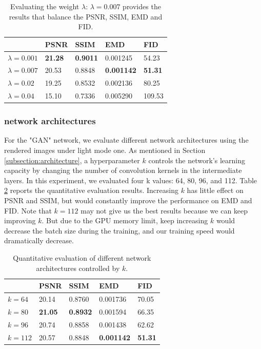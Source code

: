 \documentclass[journal]{vgtc}                %
\begin{document}
\begin{table}
\caption{Evaluating the weight $\lambda$: $\lambda=0.007$ provides the results that balance the PSNR, SSIM, EMD and FID. }
    \centering
    \begin{tabular}{l|l|l|l|l}
         & PSNR & SSIM & EMD & FID \\  \hline
         $\lambda=0.001$ & \textbf{21.28} & \textbf{0.9011} & 0.001245 & 54.23
   \\ \hline
         $\lambda=0.007$ & 20.53 & 0.8848 & \textbf{0.001142} & \textbf{51.31}  \\  \hline
         $\lambda=0.02$ & 19.25 & 0.8532 & 0.002136 & 80.25  \\  \hline
         $\lambda=0.04$ & 15.10 & 0.7336 & 0.005290 & 109.53  \\  
    \end{tabular}
    \label{table:lambda}
\end{table}

\subsubsection{network architectures}
For the "GAN" network, we evaluate different network architectures using the rendered images under light mode one. As mentioned in Section \ref{subsection:architecture}, a hyperparameter $k$ controls the network's learning capacity by changing the number of convolution kernels in the intermediate layers. In this experiment, we evaluated four k values: 64, 80, 96, and 112. Table \ref{table:architecture} reports the quantitative evaluation results. Increasing $k$ has little effect on PSNR and SSIM, but would constantly improve the performance on EMD and FID. Note that $k=112$ may not give us the best results because we can keep improving $k$. But due to the GPU memory limit, keep increasing $k$ would decrease the batch size during the training, and our training speed would dramatically decrease. 

\begin{table}
\caption{Quantitative evaluation of different network architectures controlled by $k$.}
    \centering
    \begin{tabular}{l|l|l|l|l}
         & PSNR & SSIM & EMD & FID \\  \hline
         $k=64$ & 20.14 & 0.8760 & 0.001736 & 70.05
   \\ \hline
         $k=80$ & \textbf{21.05} & \textbf{0.8932} & 0.001594 & 66.35  \\  \hline
         $k=96$ & 20.74 & 0.8858 & 0.001438 & 62.62  \\  \hline
         $k=112$ & 20.57 & 0.8848 & \textbf{0.001142} & \textbf{51.31}  \\  
    \end{tabular}
    \label{table:architecture}
\end{table}
\end{document}
